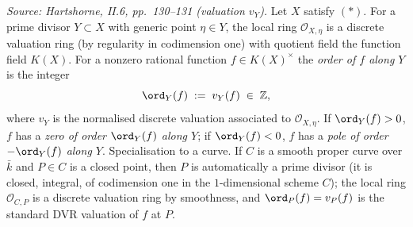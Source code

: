 \begin{definition}
  \label{def:order_at_point}

  \textit{Source: Hartshorne, II.6, pp.~130--131 (valuation \(v_Y\)).}
  Let \(X\) satisfy \((*)\). For a prime divisor \(Y \subset X\) with generic
  point \(\eta \in Y\), the local ring \(\mathcal O_{X, \eta}\) is a discrete
  valuation ring (by regularity in codimension one) with quotient field the
  function field \(K(X)\). For a nonzero rational function \(f \in K(X)^{\times}\)
  the \emph{order of \(f\) along \(Y\)} is the integer
  \[
    \ord_Y(f) \;:=\; v_Y(f) \;\in\; \mathbb Z,
  \]
  where \(v_Y\) is the normalised discrete valuation associated to
  \(\mathcal O_{X, \eta}\). If \(\ord_Y(f) > 0\), \(f\) has a \emph{zero of
  order \(\ord_Y(f)\) along \(Y\)}; if \(\ord_Y(f) < 0\), \(f\) has a \emph{pole
  of order \(-\ord_Y(f)\) along \(Y\)}.
  Specialisation to a curve. If \(C\) is a smooth proper curve over \(\bar k\)
  and \(P \in C\) is a closed point, then \(P\) is automatically a prime
  divisor (it is closed, integral, of codimension one in the \(1\)-dimensional
  scheme \(C\)); the local ring \(\mathcal O_{C, P}\) is a discrete valuation
  ring by smoothness, and \(\ord_P(f) = v_P(f)\) is the standard DVR
  valuation of \(f\) at \(P\).

\end{definition}
